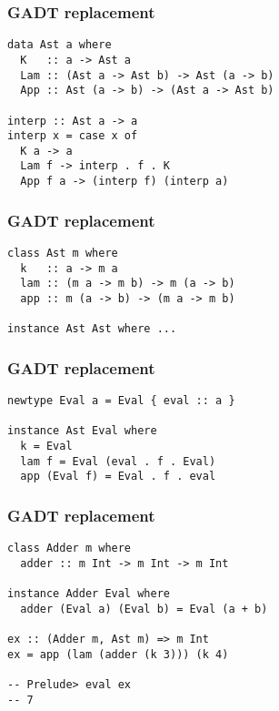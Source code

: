 \documentclass[pdf]{beamer}
\begin{document}
\begin{frame}[fragile]
  \frametitle{GADT replacement}
\begin{lstlisting}
data Ast a where
  K   :: a -> Ast a
  Lam :: (Ast a -> Ast b) -> Ast (a -> b)
  App :: Ast (a -> b) -> (Ast a -> Ast b)

interp :: Ast a -> a
interp x = case x of
  K a -> a
  Lam f -> interp . f . K
  App f a -> (interp f) (interp a)
\end{lstlisting}
\end{frame}

\begin{frame}[fragile]
  \frametitle{GADT replacement}
\begin{lstlisting}
class Ast m where
  k   :: a -> m a
  lam :: (m a -> m b) -> m (a -> b)
  app :: m (a -> b) -> (m a -> m b)

instance Ast Ast where ...
\end{lstlisting}
\end{frame}

\begin{frame}[fragile]
  \frametitle{GADT replacement}
\begin{lstlisting}
newtype Eval a = Eval { eval :: a }

instance Ast Eval where
  k = Eval
  lam f = Eval (eval . f . Eval)
  app (Eval f) = Eval . f . eval
\end{lstlisting}
\end{frame}

\begin{frame}[fragile]
  \frametitle{GADT replacement}
\begin{lstlisting}
class Adder m where
  adder :: m Int -> m Int -> m Int

instance Adder Eval where
  adder (Eval a) (Eval b) = Eval (a + b)

ex :: (Adder m, Ast m) => m Int
ex = app (lam (adder (k 3))) (k 4)

-- Prelude> eval ex
-- 7
\end{lstlisting}
\end{frame}
\end{document}
